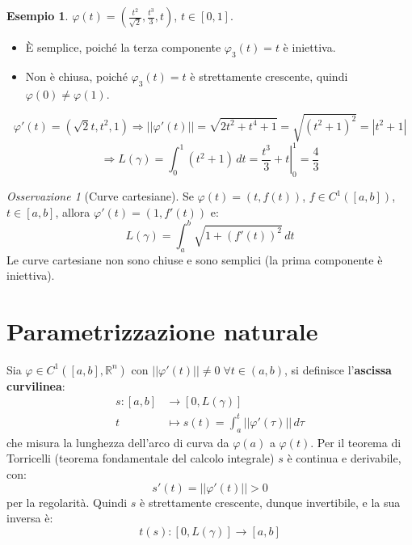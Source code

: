 \documentclass[11pt, a4paper, openright]{book}
\theoremstyle{plain}
\theoremstyle{definition}
\newtheorem{esempio}[teorema]{Esempio}
\theoremstyle{remark}
\newtheorem{osservazione}[teorema]{Osservazione}
\begin{document}
\begin{esempio}
    $\varphi(t) = \left(\frac{t^2}{\sqrt{2}}, \frac{t^3}{3}, t\right)$, $t \in [0, 1]$.
    \begin{itemize}
        \item È semplice, poiché la terza componente $\varphi_3(t) = t$ è iniettiva.
        \item Non è chiusa, poiché $\varphi_3(t) = t$ è strettamente crescente, quindi $\varphi(0) \neq \varphi(1)$.
    \end{itemize}
    \begin{equation}
        \varphi'(t) = (\sqrt{2}t, t^2, 1) \Longrightarrow ||\varphi'(t)|| = \sqrt{2t^2 + t^4 + 1} = \sqrt{(t^2 + 1)^2} = |t^2 + 1|
    \end{equation}
    \begin{equation}
        \Longrightarrow L(\gamma) = \int_{0}^{1} (t^2 + 1) \, dt = \left.\frac{t^3}{3} + t\right|_0^1 = \frac{4}{3}
    \end{equation}
\end{esempio}

\begin{osservazione}[Curve cartesiane]
    Se $\varphi(t) = (t, f(t))$, $f \in C^1([a, b])$, $t \in [a, b]$, allora $\varphi'(t) = (1, f'(t))$ e:
    \begin{equation}
        L(\gamma) = \int_{a}^{b} \sqrt{1 + (f'(t))^2} \, dt
    \end{equation}
    Le curve cartesiane non sono chiuse e sono semplici (la prima componente è iniettiva).
\end{osservazione}

\section{Parametrizzazione naturale}
Sia $\varphi \in C^1([a, b], \mathbb{R}^n)$ con $||\varphi'(t)|| \neq 0 \; \forall t \in (a, b)$, si definisce l'\textbf{ascissa curvilinea}:
\begin{equation}
    \begin{aligned}
        s: [a, b] &\longrightarrow [0, L(\gamma)] \\
        t &\longmapsto s(t) = \int_{a}^{t} ||\varphi'(\tau)|| \, d\tau
    \end{aligned}
\end{equation}
che misura la lunghezza dell'arco di curva da $\varphi(a)$ a $\varphi(t)$. Per il teorema di Torricelli (teorema fondamentale del calcolo integrale) $s$ è continua e derivabile, con:
\begin{equation}
    s'(t) = ||\varphi'(t)|| > 0
\end{equation}
per la regolarità. Quindi $s$ è strettamente crescente, dunque invertibile, e la sua inversa è:
\begin{equation}
    t(s): [0, L(\gamma)] \longrightarrow [a, b]
\end{equation}
\end{document}
